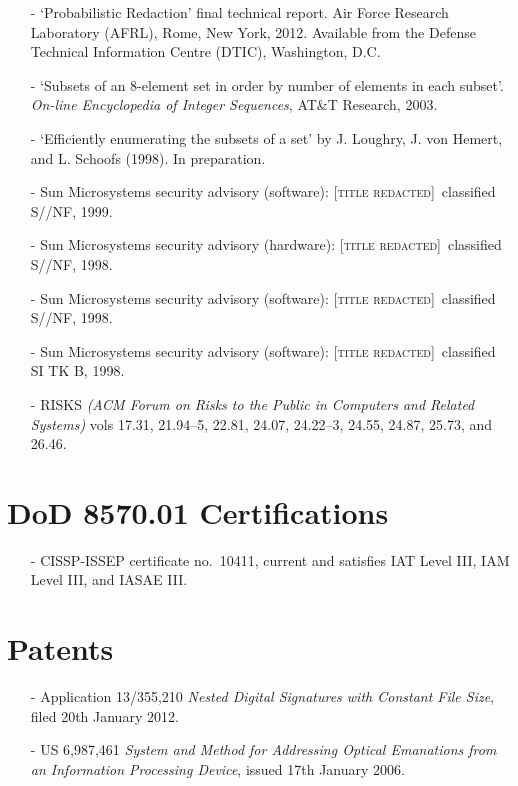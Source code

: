 \documentclass[letterpaper]{article}
\newcommand{\redacted}{\textsc{[title redacted]}}
\begin{document}
\begin{itemize}
	\item[-] `Probabilistic Redaction' final technical report. Air Force Research
		Laboratory (AFRL), Rome, New York, 2012.  Available from the Defense Technical
		Information Centre (DTIC), Washington, D.C.

	\item[-] `Subsets of an 8-element set in order by number of elements in each
		subset'. \emph{On-line Encyclopedia of Integer Sequences}, AT\&T Research, 2003.

	\item[-] `Efficiently enumerating the subsets of a set' by J. Loughry, J. von Hemert,
		and L. Schoofs (1998).  In preparation.

    \item[-] Sun Microsystems security advisory (software): \redacted\ classified S//NF, 1999.
	\item[-] Sun Microsystems security advisory (hardware): \redacted\ classified S//NF, 1998.
	\item[-] Sun Microsystems security advisory (software): \redacted\ classified S//NF, 1998.
	\item[-] Sun Microsystems security advisory (software): \redacted\ classified SI TK B, 1998.

    \item[-] RISKS \emph{(ACM Forum on Risks to the Public in Computers
    and Related Systems)} vols 17.31, 21.94--5, 22.81, 24.07,
    24.22--3, 24.55, 24.87, 25.73, and 26.46.
\end{itemize}

\section*{DoD 8570.01 Certifications}

\begin{itemize}
	\item[-] CISSP-ISSEP certificate no.\ 10411, current and satisfies IAT Level III,
		IAM Level III, and IASAE III.
\end{itemize}

\section*{Patents} %

\begin{itemize}
	\item[-] Application 13/355,210 \emph{Nested Digital Signatures with Constant File Size},
		filed 20th January 2012.

    \item[-] US 6,987,461 \emph{System and Method for Addressing Optical
		Emanations from an Information Processing Device}, issued 17th January 2006.
\end{itemize}
\end{document}
